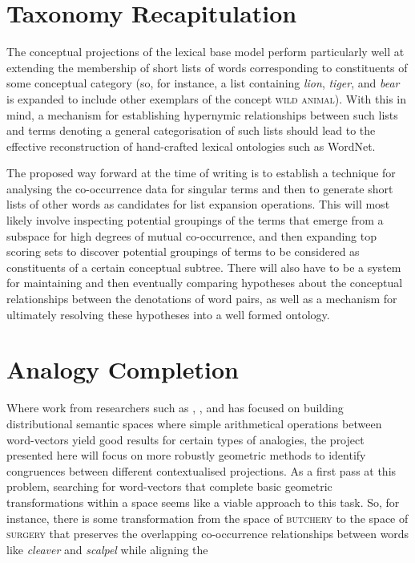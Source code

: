 \section{Taxonomy Recapitulation}
The conceptual projections of the lexical base model perform particularly well at extending the membership of short lists of words corresponding to constituents of some conceptual category (so, for instance, a list containing \emph{lion}, \emph{tiger}, and \emph{bear} is expanded to include other exemplars of the concept \textsc{wild animal}).  With this in mind, a mechanism for establishing hypernymic relationships between such lists and terms denoting a general categorisation of such lists should lead to the effective reconstruction of hand-crafted lexical ontologies such as WordNet.

The proposed way forward at the time of writing is to establish a technique for analysing the co-occurrence data for singular terms and then to generate short lists of other words as candidates for list expansion operations.  This will most likely involve inspecting potential groupings of the terms that emerge from a subspace for high degrees of mutual co-occurrence, and then expanding top scoring sets to discover potential groupings of terms to be considered as constituents of a certain conceptual subtree.  There will also have to be a system for maintaining and then eventually comparing hypotheses about the conceptual relationships between the denotations of word pairs, as well as a mechanism for ultimately resolving these hypotheses into a well formed ontology.

\section{Analogy Completion}
Where work from researchers such as \cite{Mikolov}, \cite{Pennington}, and \cite{Levy} has focused on building distributional semantic spaces where simple arithmetical operations between word-vectors yield good results for certain types of analogies, the project presented here will focus on more robustly geometric methods to identify congruences between different contextualised projections.  As a first pass at this problem, searching for word-vectors that complete basic geometric transformations within a space seems like a viable approach to this task.  So, for instance, there is some transformation from the space of \textsc{butchery} to the space of \textsc{surgery} that preserves the overlapping co-occurrence relationships between words like \emph{cleaver} and \emph{scalpel} while aligning the 

